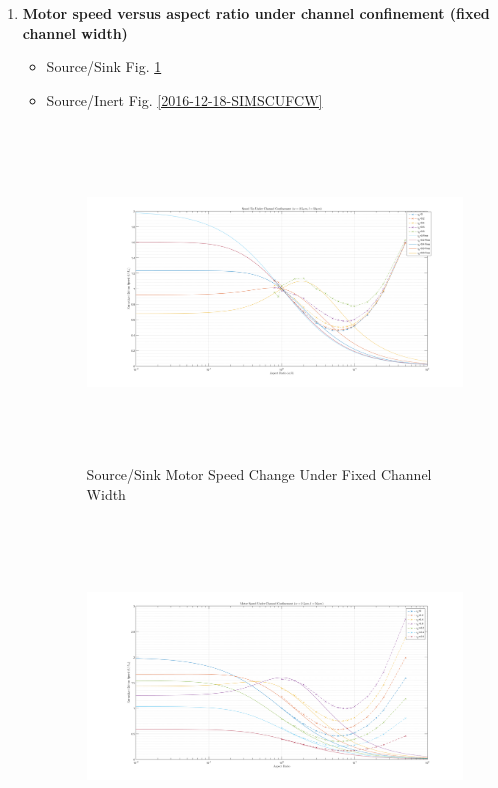 \documentclass[fontsize=11pt, %
                             paper=a4, %
                             twoside, %
                             captions=tableheading,
                             index=totoc,
                             hyperref]{labbook}
\begin{document}
\begin{addmargin}[4cm]{0cm}
\begin{enumerate}
\begin{itemize}
\begin{figure}
\end{figure}
\end{itemize}
\item \textbf{Motor speed versus aspect ratio under channel confinement (fixed channel width)}\\
\begin{itemize}
\item Source/Sink Fig. \ref{2016-12-25-SSMSCUFCW}
\item Source/Inert Fig. \ref{2016-12-18-SIMSCUFCW}
\begin{figure}
\centering
\includegraphics[width=\linewidth, height=3.5in]{2016-12-25-Ratio_SourceSink_Channel.png}
\caption{Source/Sink Motor Speed Change Under Fixed Channel Width}\label{2016-12-25-SSMSCUFCW}
\end{figure}
\begin{figure}
\centering
\includegraphics[width=\linewidth, height=3.5in]{2016-12-18-Ratio_SourceInert_Channel.png}

\end{figure}
\end{itemize}
\end{enumerate}
\end{addmargin}
\end{document}

